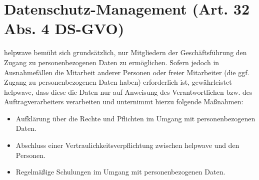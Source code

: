 \documentclass[10pt]{article}
\begin{document}
\section{Datenschutz-Management (Art. 32 Abs. 4 DS-GVO)}
helpwave bemüht sich grundsätzlich, nur Mitgliedern der Geschäftsführung den Zugang zu
personenbezogenen Daten zu ermöglichen. Sofern jedoch in Ausnahmefällen die Mitarbeit
anderer Personen oder freier Mitarbeiter (die ggf. Zugang zu personenbezogenen Daten
haben) erforderlich ist, gewährleistet helpwave, dass diese die Daten nur auf Anweisung des
Verantwortlichen bzw. des Auftragverarbeiters verarbeiten und unternimmt hierzu folgende
Maßnahmen:
\begin{itemize}
	\item Aufklärung über die Rechte und Pflichten im Umgang mit personenbezogenen Daten.
	\item Abschluss einer Vertraulichkeitsverpflichtung zwischen helpwave und den Personen.
	\item Regelmäßige Schulungen im Umgang mit personenbezogenen Daten.
\end{itemize}
\end{document}

